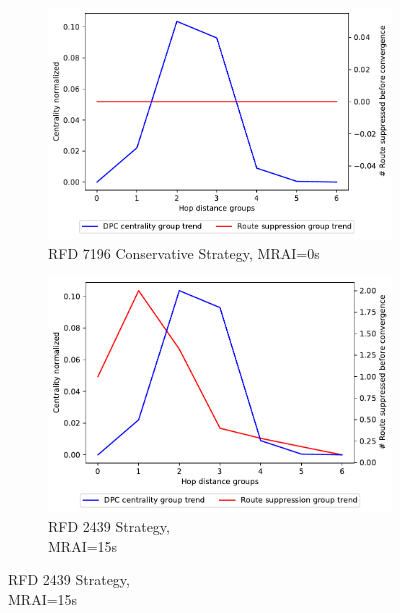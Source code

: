 \begin{figure}[H]
\begin{subfigure}[b]{0.325\textwidth}
     \end{subfigure}
     \hfill
     \begin{subfigure}[b]{0.325\textwidth}
         \centering
         \includegraphics[width=\textwidth]{images/RFD/miceVSelephants/MultiMRAI/0/mice/cisco_1000_RFD_7196_conservative_nodeConvergence_centVSsup_trend.pdf}
         \caption{RFD 7196 Conservative Strategy, MRAI=0s}
         \label{fig:1000_7196RFDC_centVSsup_mices}
     \end{subfigure}
     \vfill
     \begin{subfigure}[b]{0.325\textwidth}
         \centering
         \includegraphics[width=\textwidth]{images/RFD/miceVSelephants/MultiMRAI/15/mice/cisco_1000_RFD_nodeConvergence_centVSsup_trend.pdf}
         \caption{RFD 2439 Strategy, \\MRAI=15s}
         \label{fig:1000_2439RFD_centVSsup_mices}
     \end{subfigure}

\end{figure}
